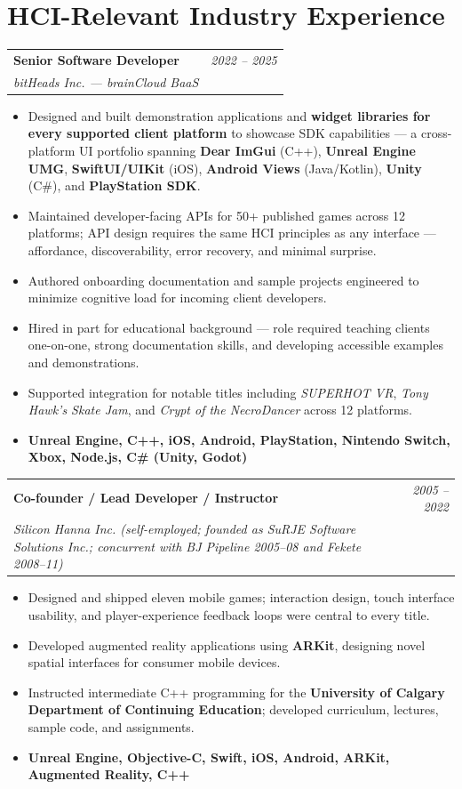 \documentclass[11pt]{article}
\makeatletter
\newcommand{\tech}[1]{\textcolor{secondary}{\textbf{#1}}}
\newcommand{\experience}[4]{%
  \vspace{4pt}
  \begin{tabular*}{\textwidth}{@{}l@{\extracolsep{\fill}}r@{}}
    \textbf{#1} & \textit{#2} \\
    \textit{\small#3} & \textit{\small#4}
  \end{tabular*}
  \vspace{-4pt}
}
\makeatother
\begin{document}
\section*{HCI-Relevant Industry Experience}

\experience{Senior Software Developer}{2022 -- 2025}{bitHeads Inc. \normalfont\small\textit{--- brainCloud BaaS}}{}
\begin{itemize}
    \item Designed and built demonstration applications and \textbf{widget libraries for every supported client platform} to showcase SDK capabilities --- a cross-platform UI portfolio spanning \tech{Dear ImGui} (C++), \tech{Unreal Engine UMG}, \tech{SwiftUI/UIKit} (iOS), \tech{Android Views} (Java/Kotlin), \tech{Unity} (C\#), and \tech{PlayStation SDK}.
    \item Maintained developer-facing APIs for 50+ published games across 12 platforms; API design requires the same HCI principles as any interface --- affordance, discoverability, error recovery, and minimal surprise.
    \item Authored onboarding documentation and sample projects engineered to minimize cognitive load for incoming client developers.
    \item Hired in part for educational background --- role required teaching clients one-on-one, strong documentation skills, and developing accessible examples and demonstrations.
    \item Supported integration for notable titles including \textit{SUPERHOT VR}, \textit{Tony Hawk's Skate Jam}, and \textit{Crypt of the NecroDancer} across 12 platforms.
    \item[] \tech{Unreal Engine, C++, iOS, Android, PlayStation, Nintendo Switch, Xbox, Node.js, C\# (Unity, Godot)}
\end{itemize}

\experience{Co-founder / Lead Developer / Instructor}{2005 -- 2022}{Silicon Hanna Inc. \normalfont\small\textit{(self-employed; founded as SuRJE Software Solutions Inc.; concurrent with BJ Pipeline 2005--08 and Fekete 2008--11)}}{}
\begin{itemize}
    \item Designed and shipped eleven mobile games; interaction design, touch interface usability, and player-experience feedback loops were central to every title.
    \item Developed augmented reality applications using \tech{ARKit}, designing novel spatial interfaces for consumer mobile devices.
    \item Instructed intermediate C++ programming for the \textbf{University of Calgary Department of Continuing Education}; developed curriculum, lectures, sample code, and assignments.
    \item[] \tech{Unreal Engine, Objective-C, Swift, iOS, Android, ARKit, Augmented Reality, C++}
\end{itemize}
\end{document}
